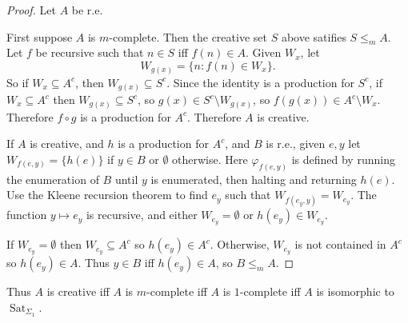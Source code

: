 \documentclass[12pt]{report}
\DeclareMathOperator{\Sat}{Sat}
\theoremstyle{definition}
\begin{document}
\begin{proof}
Let $A$ be r.e.

First suppose $A$ is $m$-complete. Then the creative set $S$ above satifies $S \leq_m A$. Let $f$ be recursive such that $n \in S$ iff $f(n) \in A$.
Given $W_x$, let
$$W_{g(x)} = \{n: f(n) \in W_x\}.$$
So if $W_x \subseteq A^c$, then $W_{g(x)} \subseteq S^c$. Since the identity is a production for $S^c$, if $W_x \subseteq A^c$ then $W_{g(x)} \subseteq S^c$, so $g(x) \in S^c \setminus W_{g(x)}$, so $f(g(x)) \in A^c \setminus W_x$.
Therefore $f \circ g$ is a production for $A^c$. Therefore $A$ is creative.

If $A$ is creative, and $h$ is a production for $A^c$, and $B$ is r.e., given $e,y$ let $W_{f(e,y)} = \{h(e)\}$ if $y \in B$ or $\emptyset$ otherwise.
Here $\varphi_{f(e, y)}$ is defined by running the enumeration of $B$ until $y$ is enumerated, then halting and returning $h(e)$.
Use the Kleene recursion theorem to find $e_y$ such that $W_{f(e_y, y)} = W_{e_y}$. The function $y \mapsto e_y$ is recursive, and either $W_{e_y} = \emptyset$ or $h(e_y) \in W_{e_y}$.

If $W_{e_y} = \emptyset$ then $W_{e_y} \subseteq A^c$ so $h(e_y) \in A^c$. Otherwise, $W_{e_y}$ is not contained in $A^c$ so $h(e_y) \in A$. Thus $y \in B$ iff $h(e_y) \in A$, so $B \leq_m A$.
\end{proof}
Thus $A$ is creative iff $A$ is $m$-complete iff $A$ is $1$-complete iff $A$ is isomorphic to $\Sat_{\Sigma_1}$.
\end{document}
